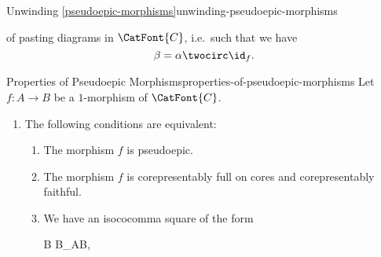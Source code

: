 \begin{remark}{Unwinding \cref{pseudoepic-morphisms}}{unwinding-pseudoepic-morphisms}
\begin{enumerate}
\begin{webcompile}
            \end{webcompile}
            of pasting diagrams in $\CatFont{C}$, i.e.\ such that we have
            \[
                \beta%
                =%
                \alpha\twocirc\id_{f}.%
            \]%
    \end{enumerate}
\end{remark}
\begin{proposition}{Properties of Pseudoepic Morphisms}{properties-of-pseudoepic-morphisms}%
    Let $f\colon A\to B$ be a $1$-morphism of $\CatFont{C}$.
    \begin{enumerate}
        \item\label{properties-of-pseudoepic-morphisms-characterisations}The following conditions are equivalent:
            \begin{enumerate}
                \item\label{properties-of-pseudoepic-morphisms-characterisations-a}The morphism $f$ is pseudoepic.
                \item\label{properties-of-pseudoepic-morphisms-characterisations-b}The morphism $f$ is corepresentably full on cores and corepresentably faithful.
                \item\label{properties-of-pseudoepic-morphisms-characterisations-c}We have an isococomma square of the form
                    \begin{webcompile}
                        B%
                        \eqcong%
                        B\isococomma_{A}B,%
                        \quad
\end{webcompile}
\end{enumerate}
\end{enumerate}
\end{proposition}
